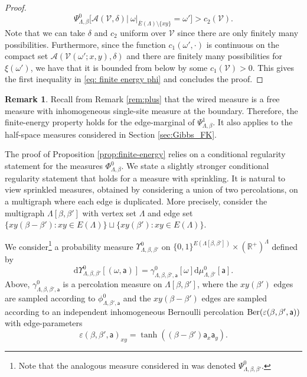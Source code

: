 \documentclass[11pt,a4paper]{article}
\numberwithin{equation}{section}
\theoremstyle{plain}
\theoremstyle{definition}
\newtheorem{Rem}[Thm]{Remark}
\begin{document}
\begin{proof}
    \begin{equation}
        \Psi^0_{\Lambda,\beta}\Big[ \mathcal A(\mathcal V, \delta) \Big| \:\omega|_{\overline E(\Lambda)\setminus \{xy\}} = \omega'\Big] > c_2(\mathcal V).
    \end{equation}
    Note that we can take $\delta$ and $c_2$ uniform over $\mathcal V$ since there are only finitely many possibilities. Furthermore, since the function $c_1(\omega',\cdot)$ is continuous on the compact set $\mathcal A(\mathcal V(\omega';x,y),\delta)$ and there are finitely many possibilities for $\xi(\omega')$, we have that it is bounded from below by some $c_1(\mathcal V)>0$. This gives the first inequality in \eqref{eq: finite energy phi} and concludes the proof.
    \end{proof}

\begin{Rem}
Recall from Remark \ref{rem:plus} that the wired measure is a free measure with inhomogeneous single-site measure at the boundary. Therefore, the finite-energy property holds for the edge-marginal of $\Psi^1_{\Lambda,\beta}$. It also applies to the half-space measures considered in Section \ref{sec:Gibbs_FK}.
\end{Rem}

The proof of Proposition \ref{prop:finite-energy} relies on a conditional regularity statement for the measures $\Phi^0_{\Lambda,\beta}$. We state a slightly stronger conditional regularity statement that holds for a measure with sprinkling. It is natural to view  sprinkled measures, obtained by considering a union of two percolations, on a multigraph where each edge is duplicated. More precisely, consider the multigraph $\Lambda[\beta,\beta']$ with vertex set $\Lambda$ and edge set $\{ xy(\beta-\beta') : xy \in E(\Lambda)\} \sqcup \{xy(\beta') : xy \in E(\Lambda) \}$.

We consider\footnote{Note that the analogous measure considered in \cite{gunaratnam2025supercritical} was denoted $\Psi^0_{\Lambda,\beta,\beta'}$.} a probability measure $\Upsilon^0_{\Lambda,\beta,\beta'}$ on $\{0,1\}^{E(\Lambda[\beta,\beta'])}\times (\mathbb R^+)^\Lambda $ defined by
\begin{equation}
\mathrm{d}\Upsilon^0_{\Lambda,\beta,\beta'}[(\omega,\mathsf a)] =  \gamma_{\Lambda,\beta,\beta',\mathsf a}^{0}[\omega] \mathrm{d}\mu^0_{\Lambda,\beta'}[\mathsf a].
\end{equation}
Above, $\gamma_{\Lambda,\beta,\beta',\mathsf a}^0$ is a percolation measure on $\Lambda[\beta,\beta']$, where the $xy(\beta')$ edges are sampled according to $\phi^0_{\Lambda,\beta',\mathsf{a}}$ and the $xy(\beta-\beta')$ edges are sampled according to an independent inhomogeneous Bernoulli percolation $\textup{Ber}(\varepsilon(\beta,\beta', \mathsf a))$ with edge-parameters
\begin{equation}
\varepsilon(\beta,\beta',\mathsf a)_{xy} = \tanh ((\beta -\beta')\mathsf a_x\mathsf a_y).
\end{equation}
\end{document}
